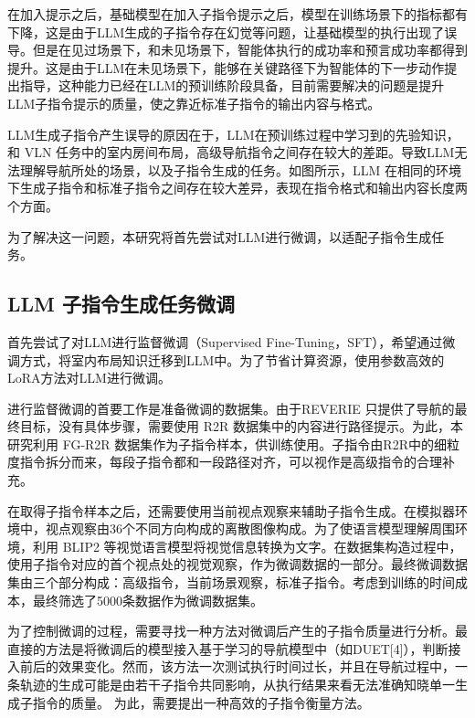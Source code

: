 \documentclass[bachelor]{thesis-uestc}
\begin{document}
在加入提示之后，基础模型在加入子指令提示之后，模型在训练场景下的指标都有下降，这是由于LLM生成的子指令存在幻觉等问题，让基础模型的执行出现了误导。但是在见过场景下，和未见场景下，智能体执行的成功率和预言成功率都得到提升。这是由于LLM在未见场景下，能够在关键路径下为智能体的下一步动作提出指导，这种能力已经在LLM的预训练阶段具备，目前需要解决的问题是提升LLM子指令提示的质量，使之靠近标准子指令的输出内容与格式。

LLM生成子指令产生误导的原因在于，LLM在预训练过程中学习到的先验知识，和 VLN 任务中的室内房间布局，高级导航指令之间存在较大的差距。导致LLM无法理解导航所处的场景，以及子指令生成的任务。如图所示，LLM 在相同的环境下生成子指令和标准子指令之间存在较大差异，表现在指令格式和输出内容长度两个方面。


为了解决这一问题，本研究将首先尝试对LLM进行微调，以适配子指令生成任务。

\subsection{LLM 子指令生成任务微调}


首先尝试了对LLM进行监督微调（Supervised Fine-Tuning，SFT），希望通过微调方式，将室内布局知识迁移到LLM中。为了节省计算资源，使用参数高效的LoRA方法对LLM进行微调。

进行监督微调的首要工作是准备微调的数据集。由于REVERIE 只提供了导航的最终目标，没有具体步骤，需要使用 R2R 数据集中的内容进行路径提示。为此，本研究利用 FG-R2R 数据集作为子指令样本，供训练使用。子指令由R2R中的细粒度指令拆分而来，每段子指令都和一段路径对齐，可以视作是高级指令的合理补充。

在取得子指令样本之后，还需要使用当前视点观察来辅助子指令生成。在模拟器环境中，视点观察由36个不同方向构成的离散图像构成。为了使语言模型理解周围环境，利用 BLIP2 等视觉语言模型将视觉信息转换为文字。在数据集构造过程中，使用子指令对应的首个视点处的视觉观察，作为微调数据的一部分。最终微调数据集由三个部分构成：高级指令，当前场景观察，标准子指令。考虑到训练的时间成本，最终筛选了5000条数据作为微调数据集。



为了控制微调的过程，需要寻找一种方法对微调后产生的子指令质量进行分析。最直接的方法是将微调后的模型接入基于学习的导航模型中（如DUET[4]），判断接入前后的效果变化。然而，该方法一次测试执行时间过长，并且在导航过程中，一条轨迹的生成可能是由若干子指令共同影响，从执行结果来看无法准确知晓单一生成子指令的质量。 为此，需要提出一种高效的子指令衡量方法。
\end{document}
